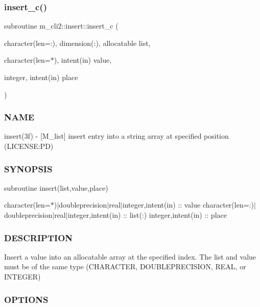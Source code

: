 \subsubsection{\texorpdfstring{insert\+\_\+c()}{insert\_c()}}
{\footnotesize\ttfamily subroutine m\+\_\+cli2\+::insert\+::insert\+\_\+c (\begin{DoxyParamCaption}\item[{character(len=\+:), dimension(\+:), allocatable}]{list,  }\item[{character(len=$\ast$), intent(in)}]{value,  }\item[{integer, intent(in)}]{place }\end{DoxyParamCaption})\hspace{0.3cm}{\ttfamily [private]}}



\subsubsection*{N\+A\+ME}

insert(3f) -\/ \mbox{[}M\+\_\+list\mbox{]} insert entry into a string array at specified position (L\+I\+C\+E\+N\+SE\+:PD) 

\subsubsection*{S\+Y\+N\+O\+P\+S\+IS}

subroutine insert(list,value,place)

character(len=$\ast$)$\vert$doubleprecision$\vert$real$\vert$integer,intent(in) \+:\+: value character(len=\+:)$\vert$doubleprecision$\vert$real$\vert$integer,intent(in) \+:\+: list(\+:) integer,intent(in) \+:\+: place

\subsubsection*{D\+E\+S\+C\+R\+I\+P\+T\+I\+ON}

\begin{DoxyVerb}Insert a value into an allocatable array at the specified index.
The list and value must be of the same type (CHARACTER, DOUBLEPRECISION,
REAL, or INTEGER)
\end{DoxyVerb}


\subsubsection*{O\+P\+T\+I\+O\+NS}


